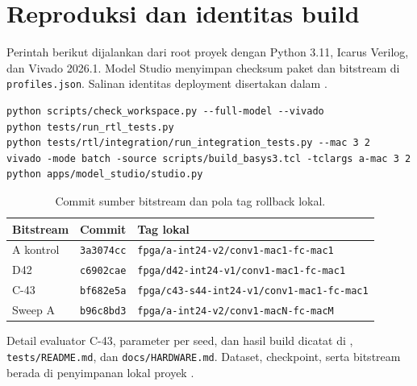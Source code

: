 \documentclass[11pt,a4paper]{article}
\begin{document}
\section{Reproduksi dan identitas build}
Perintah berikut dijalankan dari root proyek dengan Python 3.11,
Icarus Verilog, dan Vivado 2026.1. Model Studio menyimpan checksum
paket dan bitstream di \texttt{profiles.json}. Salinan identitas
deployment disertakan dalam .
\begin{verbatim}
python scripts/check_workspace.py --full-model --vivado
python tests/run_rtl_tests.py
python tests/rtl/integration/run_integration_tests.py --mac 3 2
vivado -mode batch -source scripts/build_basys3.tcl -tclargs a-mac 3 2
python apps/model_studio/studio.py
\end{verbatim}

\begin{table}[H]
\centering\small
\caption{Commit sumber bitstream dan pola tag rollback lokal.}
\begin{tabular}{lll}
\toprule
Bitstream & Commit & Tag lokal \\
\midrule
A kontrol & \texttt{3a3074cc} & \texttt{fpga/a-int24-v2/conv1-mac1-fc-mac1} \\
D42 & \texttt{c6902cae} & \texttt{fpga/d42-int24-v1/conv1-mac1-fc-mac1} \\
C-43 & \texttt{bf682e5a} & \texttt{fpga/c43-s44-int24-v1/conv1-mac1-fc-mac1} \\
Sweep A & \texttt{b96c8bd3} & \texttt{fpga/a-int24-v2/conv1-macN-fc-macM} \\
\bottomrule
\end{tabular}
\end{table}

Detail evaluator C-43, parameter per seed, dan hasil build dicatat di
, \texttt{tests/README.md},
dan \texttt{docs/HARDWARE.md}. Dataset, checkpoint, serta bitstream
berada di penyimpanan lokal proyek \cite{repo}.
\end{document}
